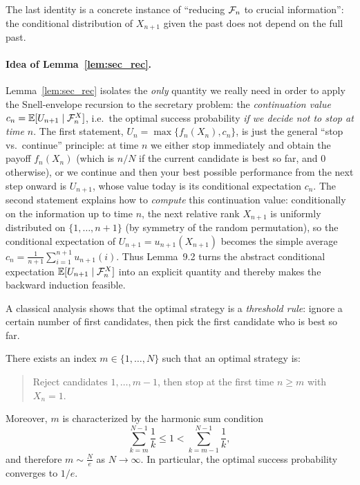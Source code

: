 \begin{remark}
The last identity is a concrete instance of ``reducing $\mathcal{F}_n$ to crucial information'':
the conditional distribution of $X_{n+1}$ given the past does not depend on the full past.
\end{remark}

\paragraph{Idea of Lemma~\ref{lem:sec_rec}.}
Lemma~\ref{lem:sec_rec} isolates the \emph{only} quantity we really need in order to apply the Snell-envelope recursion
to the secretary problem: the \emph{continuation value} $c_n=\mathbb{E}[U_{n+1}\mid\mathcal{F}_n^X]$, i.e.\ the optimal
success probability \emph{if we decide not to stop at time $n$}.  The first statement,
$U_n=\max\{f_n(X_n),c_n\}$, is just the general ``stop vs.\ continue'' principle: at time $n$ we either
stop immediately and obtain the payoff $f_n(X_n)$ (which is $n/N$ if the current candidate is best so far,
and $0$ otherwise), or we continue and then your best possible performance from the next step onward is
$U_{n+1}$, whose value today is its conditional expectation $c_n$.  The second statement explains how to
\emph{compute} this continuation value: conditionally on the information up to time $n$, the next relative
rank $X_{n+1}$ is uniformly distributed on $\{1,\dots,n+1\}$ (by symmetry of the random permutation), so
the conditional expectation of $U_{n+1}=u_{n+1}(X_{n+1})$ becomes the simple average
$c_n=\frac{1}{n+1}\sum_{i=1}^{n+1}u_{n+1}(i)$.  Thus Lemma~9.2 turns the abstract conditional expectation
$\mathbb{E}[U_{n+1}\mid\mathcal{F}_n^X]$ into an explicit quantity and thereby makes the backward induction feasible.


A classical analysis shows that the optimal strategy is a \emph{threshold rule}:
ignore a certain number of first candidates, then pick the first candidate who is best so far.

\begin{theorem}
There exists an index $m\in\{1,\dots,N\}$ such that an optimal strategy is:
\begin{quote}
Reject candidates $1,\dots,m-1$, then stop at the first time $n\ge m$ with $X_n=1$.
\end{quote}
Moreover, $m$ is characterized by the harmonic sum condition
\[
\sum_{k=m}^{N-1}\frac{1}{k}\le 1 < \sum_{k=m-1}^{N-1}\frac{1}{k},
\]
and therefore $m\sim \frac{N}{e}$ as $N\to\infty$. In particular, the optimal success probability converges to $1/e$.
\end{theorem}

